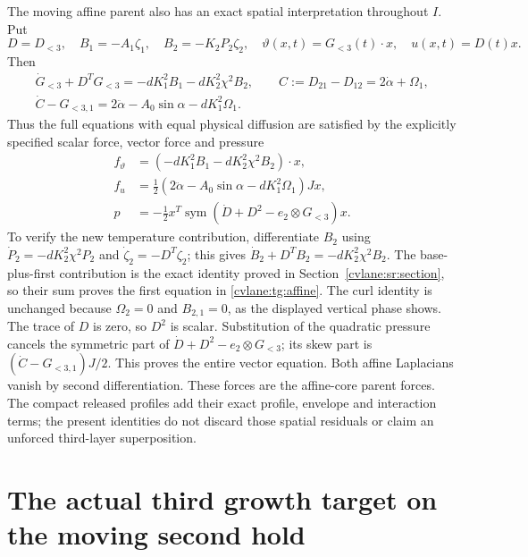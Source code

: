 The moving affine parent also has an exact spatial interpretation
throughout $I$. Put
\[
 D=D_{<3},\quad B_1=-A_1\zeta_1,\quad B_2=-K_2P_2\zeta_2,
 \quad\vartheta(x,t)=G_{<3}(t)\cdot x,\quad u(x,t)=D(t)x.
\]
Then
\begin{equation}\label{cvlane:tg:affine}
\begin{gathered}
 \dot G_{<3}+D^TG_{<3}=-dK_1^2B_1-dK_2^2\chi^2B_2,\qquad
 C:=D_{21}-D_{12}=2\dot\alpha+\Omega_1,\\
 \dot C-G_{<3,1}=2\ddot\alpha-A_0\sin\alpha-dK_1^2\Omega_1.
\end{gathered}
\end{equation}
Thus the full equations with equal physical diffusion are satisfied by
the explicitly specified scalar force, vector force and pressure
\begin{equation}\label{cvlane:tg:affine_forces}
\begin{aligned}
 f_\vartheta&=(-dK_1^2B_1-dK_2^2\chi^2B_2)\cdot x,\\
 f_u&=\tfrac12(2\ddot\alpha-A_0\sin\alpha-dK_1^2\Omega_1)Jx,\\
 p&=-\tfrac12x^T\operatorname{sym}
       (\dot D+D^2-e_2\otimes G_{<3})x.
\end{aligned}
\end{equation}
To verify the new temperature contribution, differentiate $B_2$
using $\dot P_2=-dK_2^2\chi^2P_2$ and
$\dot\zeta_2=-D^T\zeta_2$; this gives
$\dot B_2+D^TB_2=-dK_2^2\chi^2B_2$.
The base-plus-first contribution is the exact identity proved in
Section~\ref{cvlane:sr:section}, so their sum proves the first equation
in \eqref{cvlane:tg:affine}. The curl identity is unchanged because
$\Omega_2=0$ and $B_{2,1}=0$, as the displayed vertical phase shows.
The trace of $D$ is zero, so $D^2$ is scalar. Substitution of the
quadratic pressure cancels the symmetric part of
$\dot D+D^2-e_2\otimes G_{<3}$; its skew part is
$(\dot C-G_{<3,1})J/2$. This proves the entire vector equation.
Both affine Laplacians vanish by second differentiation.
These forces are the affine-core parent forces. The compact released
profiles add their exact profile, envelope and interaction terms;
the present identities do not discard those spatial residuals or
claim an unforced third-layer superposition.


\section{The actual third growth target on the moving second hold}
\label{cvlane:tge:section}

